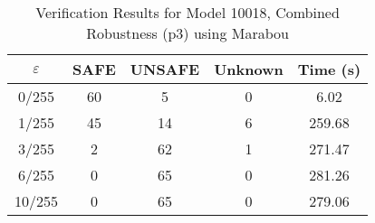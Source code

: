\begin{table}[htbp]
\centering
\caption{Verification Results for Model 10018, Combined Robustness (p3) using Marabou}
\label{tab:model10018_p3_marabou}
\begin{tabular}{|c|c|c|c|c|}
\hline
$\varepsilon$ & SAFE & UNSAFE & Unknown & Time (s) \\ \hline
0/255 & 60 & 5 & 0 & 6.02 \\ \hline
1/255 & 45 & 14 & 6 & 259.68 \\ \hline
3/255 & 2 & 62 & 1 & 271.47 \\ \hline
6/255 & 0 & 65 & 0 & 281.26 \\ \hline
10/255 & 0 & 65 & 0 & 279.06 \\ \hline
\end{tabular}
\end{table}
